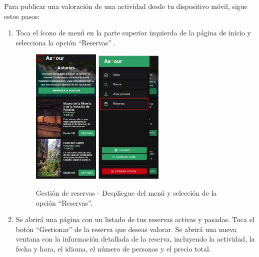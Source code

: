 Para publicar una valoración de una actividad desde tu dispositivo móvil, sigue estos pasos:
\begin{enumerate}
	\item Toca el ícono de menú en la parte superior izquierda de la página de inicio y selecciona la opción “Reservas” .
	      \begin{figure}[H]
		      \centering
		      \includegraphics[width=0.3\textwidth]{7-Construccion/Manuales/mobile/menu marcado.png}
		      \includegraphics[width=0.3\textwidth]{7-Construccion/Manuales/mobile/reservas marcado.png}
		      \caption{Gestión de reservas - Despliegue del menú y selección de la opción “Reservas”.}
	      \end{figure}
	\item Se abrirá una página con un listado de tus reservas activas y pasadas. Toca el botón “Gestionar” de la reserva que deseas valorar.
	      Se abrirá una nueva ventana con la información detallada de la reserva, incluyendo la actividad, la fecha y hora, el idioma, el número de personas y el precio total.

\end{enumerate}

